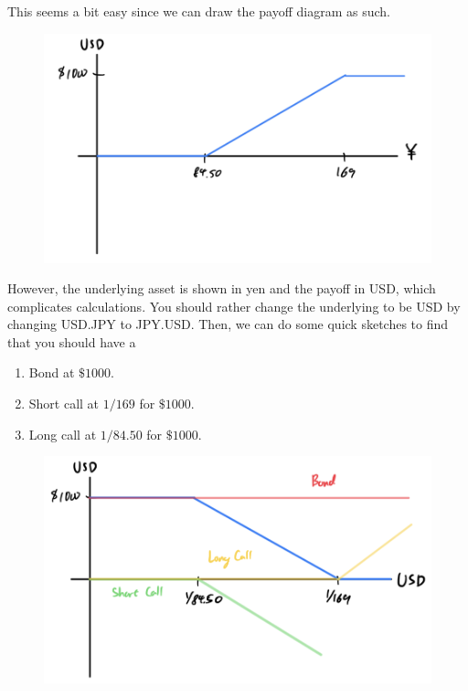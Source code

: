 \documentclass{article}
\begin{document}
      \begin{solution}
        This seems a bit easy since we can draw the payoff diagram as such. 
        \begin{figure}[H]
          \centering 
          \includegraphics[scale=0.2]{img/ex1-23-1.png}
          \caption{} 
          \label{fig:ex1-23-1}
        \end{figure}
        However, the underlying asset is shown in yen and the payoff in USD, which complicates calculations. You should rather change the underlying to be USD by changing USD.JPY to JPY.USD. Then, we can do some quick sketches to find that you should have a 
        \begin{enumerate}
          \item Bond at $\$1000$. 
          \item Short call at $1/169$ for $\$1000$. 
          \item Long call at $1/84.50$ for $\$1000$.
        \end{enumerate}
        \begin{figure}[H]
          \centering 
          \includegraphics[scale=0.2]{img/ex1-23-2.png}
          \caption{} 
          \label{fig:ex1-23-2}
        \end{figure}
      \end{solution}
\end{document}
